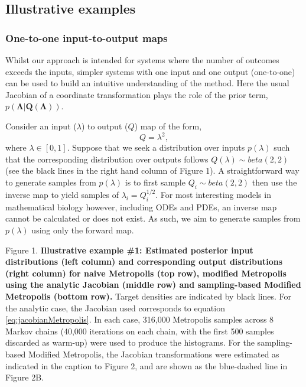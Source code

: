 \documentclass[10pt,letterpaper]{article}
\begin{document}
\subsection{Illustrative examples}\label{sec:illustrativeExamples}

\subsubsection{One-to-one input-to-output maps}
\label{sec:one-2-one}
Whilst our approach is intended for systems where the number of outcomes exceeds the inputs, simpler systems with one input and one output (one-to-one) can be used to build an intuitive understanding of the method. Here the usual Jacobian of a coordinate transformation plays the role of the prior term,  $p(\boldsymbol{\Lambda}|\boldsymbol{Q}(\boldsymbol{\Lambda}))$.

\bigskip
{}

Consider an input ($\lambda$) to output ($Q$) map of the form,
%
\begin{equation}\label{eq:quadratic_functional}
Q = \lambda^{2},
\end{equation}
%
where $\lambda\in[0,1]$. Suppose that we seek a distribution over inputs $p(\lambda)$ such that the corresponding distribution over outputs follows $Q(\lambda) \sim beta(2,2)$ (see the black lines in the right hand column of Figure 1). A straightforward way to generate samples from $p(\lambda)$ is to first sample $Q_i \sim beta(2,2)$ then use the inverse map to yield samples of $\lambda_i = Q_i^{1/2}$. For most interesting models in mathematical biology however, including ODEs and PDEs, an inverse map cannot be calculated or does not exist. As such, we aim to generate samples from $p(\lambda)$ using only the forward map.

\vspace{0.5cm}

Figure 1. \textbf{Illustrative example \#1: Estimated posterior input distributions (left column) and corresponding output distributions (right column) for naive Metropolis (top row), modified Metropolis using the analytic Jacobian (middle row) and sampling-based Modified Metropolis (bottom row).} Target densities are indicated by black lines. For the analytic case, the Jacobian used corresponds to equation \eqref{eq:jacobianMetropolis}. In each case, 316,000 Metropolis samples across 8 Markov chains (40,000 iterations on each chain, with the first 500 samples discarded as warm-up) were used to produce the histograms. For the sampling-based Modified Metropolis, the Jacobian transformations were estimated as indicated in the caption to Figure 2, and are shown as the blue-dashed line in Figure 2B.
\end{document}
